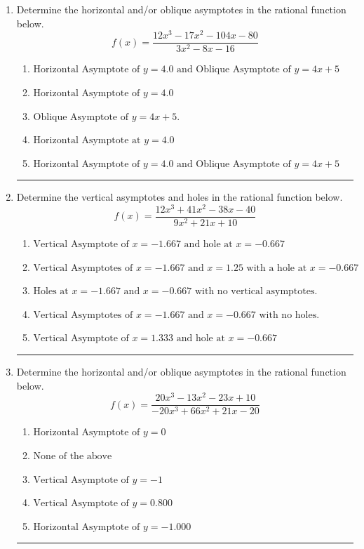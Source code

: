\documentclass[14pt]{extbook}
\newcommand{\litem}[1]{\item#1\hspace*{-1cm}\rule{\textwidth}{0.4pt}}
\begin{document}
\begin{enumerate}
{\begin{enumerate}[label=\Alph*.]
\end{enumerate} }
\litem{
Determine the horizontal and/or oblique asymptotes in the rational function below.\[ f(x) = \frac{12x^{3} -17 x^{2} -104 x -80}{3x^{2} -8 x -16} \]\begin{enumerate}[label=\Alph*.]
\item \( \text{Horizontal Asymptote of } y = 4.0 \text{ and Oblique Asymptote of } y = 4x + 5 \)
\item \( \text{Horizontal Asymptote of } y = 4.0  \)
\item \( \text{Oblique Asymptote of } y = 4x + 5. \)
\item \( \text{Horizontal Asymptote at } y = 4.0 \)
\item \( \text{Horizontal Asymptote of } y = 4.0 \text{ and Oblique Asymptote of } y = 4x + 5 \)

\end{enumerate} }
\litem{
Determine the vertical asymptotes and holes in the rational function below.\[ f(x) = \frac{12x^{3} +41 x^{2} -38 x -40}{9x^{2} +21 x + 10} \]\begin{enumerate}[label=\Alph*.]
\item \( \text{Vertical Asymptote of } x = -1.667 \text{ and hole at } x = -0.667 \)
\item \( \text{Vertical Asymptotes of } x = -1.667 \text{ and } x = 1.25 \text{ with a hole at } x = -0.667 \)
\item \( \text{Holes at } x = -1.667 \text{ and } x = -0.667 \text{ with no vertical asymptotes.} \)
\item \( \text{Vertical Asymptotes of } x = -1.667 \text{ and } x = -0.667 \text{ with no holes.} \)
\item \( \text{Vertical Asymptote of } x = 1.333 \text{ and hole at } x = -0.667 \)

\end{enumerate} }
\litem{
Determine the horizontal and/or oblique asymptotes in the rational function below.\[ f(x) = \frac{20x^{3} -13 x^{2} -23 x + 10}{-20x^{3} +66 x^{2} +21 x -20} \]\begin{enumerate}[label=\Alph*.]
\item \( \text{Horizontal Asymptote of } y = 0  \)
\item \( \text{None of the above} \)
\item \( \text{Vertical Asymptote of } y = -1  \)
\item \( \text{Vertical Asymptote of } y = 0.800  \)
\item \( \text{Horizontal Asymptote of } y = -1.000  \)


\end{enumerate}}
\end{enumerate}
\end{document}
